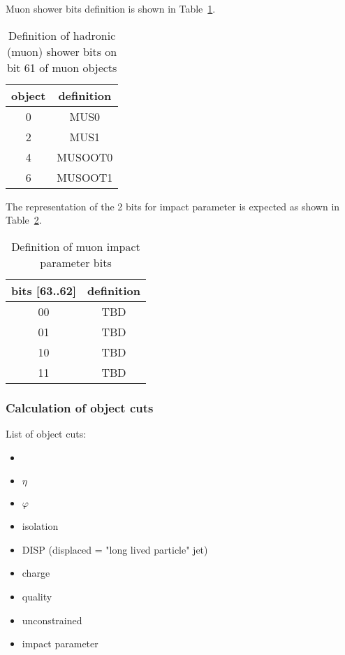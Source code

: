 Muon shower bits definition is shown in Table~\ref{tab:gtl:tab_muon_shower_bits}.\\

\begin{table}[ht]
\caption{Definition of hadronic (muon) shower bits on bit 61 of muon objects}
\vspace{5mm}
\centering
\begin{tabular}{|c|c|}\hline
object & definition \\\hline\hline
0 & MUS0 \\
2 & MUS1 \\
4 & MUSOOT0 \\
6 & MUSOOT1 \\\hline
\end{tabular}
\label{tab:gtl:tab_muon_shower_bits}
\end{table}


The representation of the 2 bits for impact parameter is expected as shown in Table~\ref{tab:gtl:muon_iso_bits}.\\

\begin{table}[ht]
\caption{Definition of muon impact parameter bits}
\vspace{5mm}
\centering
\begin{tabular}{|c|c|}\hline
bits [63..62] & definition \\\hline\hline
00 & TBD \\
01 & TBD \\
10 & TBD \\
11 & TBD \\\hline
\end{tabular}
\label{tab:gtl:muon_iso_bits}
\end{table}

\clearpage

\subsubsection{Calculation of object cuts}
\label{sec:gtl:calc_obj_cuts}

List of object cuts:
\begin{itemize}
\item \pt
\item $\eta$
\item $\varphi$
\item isolation
\item DISP (displaced = "long lived particle" jet)
\item charge
\item quality
\item unconstrained \pt
\item impact parameter
\end{itemize}

